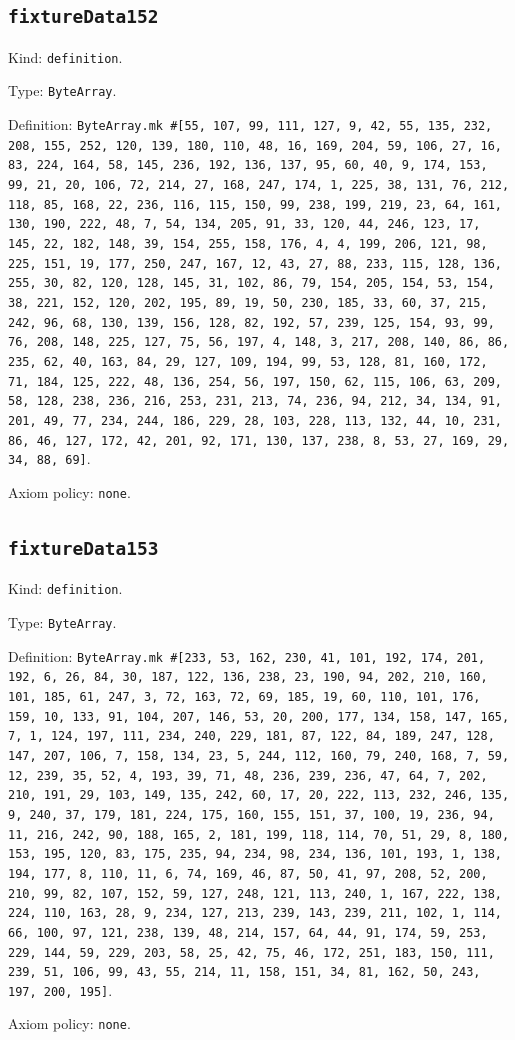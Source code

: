 \documentclass[11pt]{article}
\begin{document}
\subsection*{\texttt{fixtureData152}}
\noindent Kind: \texttt{definition}.\par
\noindent Type: \texttt{ByteArray}.\par
\noindent Definition: \texttt{ByteArray.mk \#[55, 107, 99, 111, 127, 9, 42, 55, 135, 232, 208, 155, 252, 120, 139, 180, 110, 48, 16, 169, 204, 59, 106, 27, 16, 83, 224, 164, 58, 145, 236, 192, 136, 137, 95, 60, 40, 9, 174, 153, 99, 21, 20, 106, 72, 214, 27, 168, 247, 174, 1, 225, 38, 131, 76, 212, 118, 85, 168, 22, 236, 116, 115, 150, 99, 238, 199, 219, 23, 64, 161, 130, 190, 222, 48, 7, 54, 134, 205, 91, 33, 120, 44, 246, 123, 17, 145, 22, 182, 148, 39, 154, 255, 158, 176, 4, 4, 199, 206, 121, 98, 225, 151, 19, 177, 250, 247, 167, 12, 43, 27, 88, 233, 115, 128, 136, 255, 30, 82, 120, 128, 145, 31, 102, 86, 79, 154, 205, 154, 53, 154, 38, 221, 152, 120, 202, 195, 89, 19, 50, 230, 185, 33, 60, 37, 215, 242, 96, 68, 130, 139, 156, 128, 82, 192, 57, 239, 125, 154, 93, 99, 76, 208, 148, 225, 127, 75, 56, 197, 4, 148, 3, 217, 208, 140, 86, 86, 235, 62, 40, 163, 84, 29, 127, 109, 194, 99, 53, 128, 81, 160, 172, 71, 184, 125, 222, 48, 136, 254, 56, 197, 150, 62, 115, 106, 63, 209, 58, 128, 238, 236, 216, 253, 231, 213, 74, 236, 94, 212, 34, 134, 91, 201, 49, 77, 234, 244, 186, 229, 28, 103, 228, 113, 132, 44, 10, 231, 86, 46, 127, 172, 42, 201, 92, 171, 130, 137, 238, 8, 53, 27, 169, 29, 34, 88, 69]}.\par
\noindent Axiom policy: \texttt{none}.\par
\subsection*{\texttt{fixtureData153}}
\noindent Kind: \texttt{definition}.\par
\noindent Type: \texttt{ByteArray}.\par
\noindent Definition: \texttt{ByteArray.mk \#[233, 53, 162, 230, 41, 101, 192, 174, 201, 192, 6, 26, 84, 30, 187, 122, 136, 238, 23, 190, 94, 202, 210, 160, 101, 185, 61, 247, 3, 72, 163, 72, 69, 185, 19, 60, 110, 101, 176, 159, 10, 133, 91, 104, 207, 146, 53, 20, 200, 177, 134, 158, 147, 165, 7, 1, 124, 197, 111, 234, 240, 229, 181, 87, 122, 84, 189, 247, 128, 147, 207, 106, 7, 158, 134, 23, 5, 244, 112, 160, 79, 240, 168, 7, 59, 12, 239, 35, 52, 4, 193, 39, 71, 48, 236, 239, 236, 47, 64, 7, 202, 210, 191, 29, 103, 149, 135, 242, 60, 17, 20, 222, 113, 232, 246, 135, 9, 240, 37, 179, 181, 224, 175, 160, 155, 151, 37, 100, 19, 236, 94, 11, 216, 242, 90, 188, 165, 2, 181, 199, 118, 114, 70, 51, 29, 8, 180, 153, 195, 120, 83, 175, 235, 94, 234, 98, 234, 136, 101, 193, 1, 138, 194, 177, 8, 110, 11, 6, 74, 169, 46, 87, 50, 41, 97, 208, 52, 200, 210, 99, 82, 107, 152, 59, 127, 248, 121, 113, 240, 1, 167, 222, 138, 224, 110, 163, 28, 9, 234, 127, 213, 239, 143, 239, 211, 102, 1, 114, 66, 100, 97, 121, 238, 139, 48, 214, 157, 64, 44, 91, 174, 59, 253, 229, 144, 59, 229, 203, 58, 25, 42, 75, 46, 172, 251, 183, 150, 111, 239, 51, 106, 99, 43, 55, 214, 11, 158, 151, 34, 81, 162, 50, 243, 197, 200, 195]}.\par
\noindent Axiom policy: \texttt{none}.\par
\end{document}

